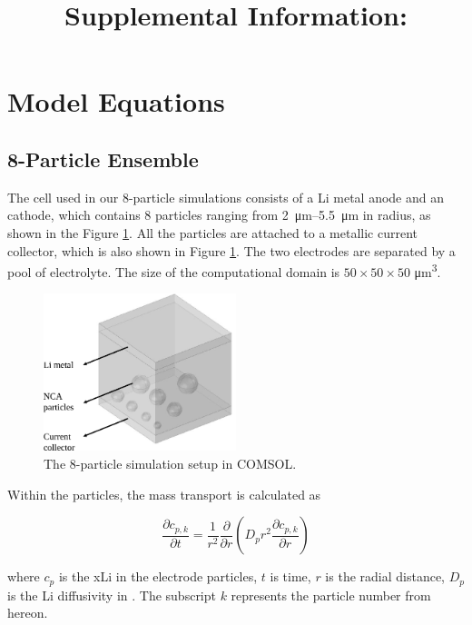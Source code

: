 \documentclass{article}
\title{Supplemental Information: \mytitle}
\begin{document}
\maketitle


\section{Model Equations}

\subsection{8-Particle Ensemble}

The cell used in our 8-particle simulations consists of a Li metal
anode and an \nca{} cathode, which contains 8 particles ranging from
\SIrange{2}{5.5}{\micro\meter} in radius, as shown in the Figure
\ref{fig:8-particle-box}. All the particles are attached to a metallic
current collector, which is also shown in Figure
\ref{fig:8-particle-box}. The two electrodes are separated by a pool
of electrolyte. The size of the computational domain is $50\times
50\times 50$ \si{\micro\meter\cubed}.

\begin{figure}
  \centering
  \includegraphics[width=0.5\textwidth]{8-particle-simulation.pdf}
  \caption{The 8-particle simulation setup in COMSOL.}
  \label{fig:8-particle-box}
\end{figure}

Within the \nca{} particles, the mass transport is calculated
as\cite{newman1993,newman1994}

\begin{equation}
  \frac{\partial c_{p,k}}{\partial t}=\frac 1{r^2}\frac \partial {\partial r}\left(D_pr^2\frac{\partial c_{p,k}}{\partial r}\right)
  \label{eq:1a}
\end{equation}
  
where $c_p$ is the \gls{xLi} in the electrode particles, $t$ is time,
$r$ is the radial distance, $D_p$ is the Li diffusivity in \nca{}. The
subscript $k$ represents the particle number from hereon.
\end{document}
